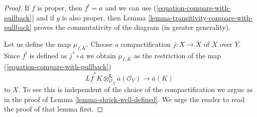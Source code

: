 \documentclass{stacks-project}
\theoremstyle{plain}
\theoremstyle{definition}
\theoremstyle{remark}
\numberwithin{equation}{subsection}
\begin{document}
\begin{proof}
If $f$ is proper, then $f^! = a$ and we can use
(\ref{equation-compare-with-pullback}) and if $g$ is also proper,
then Lemma \ref{lemma-transitivity-compare-with-pullback} proves
the commutativity of the diagram (in greater generality).

\medskip\noindent
Let us define the map $\mu_{f, K}$. Choose a compactification
$j : X \to \overline{X}$ of $X$ over $Y$. Since $f^!$ is defined
as $j^* \circ \overline{a}$ we obtain $\mu_{f, K}$ as the restriction
of the map (\ref{equation-compare-with-pullback})
$$
L\overline{f}^*K \otimes_{\mathcal{O}_{\overline{X}}}^\mathbf{L}
\overline{a}(\mathcal{O}_Y)
\longrightarrow
\overline{a}(K)
$$
to $X$. To see this is independent of the choice of the compactification
we argue as in the proof of Lemma \ref{lemma-shriek-well-defined}.
We urge the reader to read the proof of that lemma first.


\end{proof}
\end{document}
